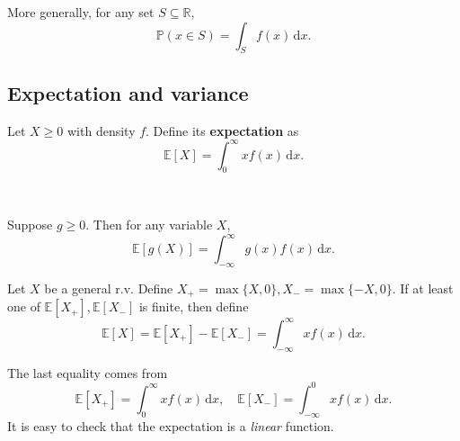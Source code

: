More generally, for any set $ S \subseteq \mathbb{R}  $, 
\[
    \mathbb{P}(x\in S) = \int_{S} f(x) \,\mathrm{d}x.
\]

\begin{center}
\end{center}

\subsection{Expectation and variance}
\begin{definition}
    Let $X\ge 0$ with density $f$. Define its \textbf{expectation} as 
    \[
        \mathbb{E}[X] = \int_{0}^{\infty} xf(x) \,\mathrm{d}x.
    \]
\end{definition}\
\begin{note}
    Suppose $g\ge 0$. Then for any variable $X$,
    \[
        \mathbb{E}[g(X)]= \int_{-\infty}^{\infty} g(x)f(x) \,\mathrm{d}x.
    \]
\end{note}
\begin{definition}
    Let $X$ be a general r.v. Define $ X_+=\max \{X,0\},X_-=\max \{-X,0\} $. If at least one of $ \mathbb{E}[X_+],\mathbb{E}[X_-] $ is finite, then define 
    \[
        \mathbb{E}[X]=\mathbb{E}[X_+]-\mathbb{E}[X_-] = \int_{-\infty}^{\infty} xf(x) \,\mathrm{d}x.
    \]
\end{definition}
\begin{note}
    The last equality comes from 
    \[
        \mathbb{E}[X_+] = \int_{0}^{\infty} xf(x) \,\mathrm{d}x,\quad \mathbb{E}[X_-]=\int_{-\infty}^{0} xf(x) \,\mathrm{d}x.
    \]
    It is easy to check that the expectation is a \textit{linear} function.
\end{note}

